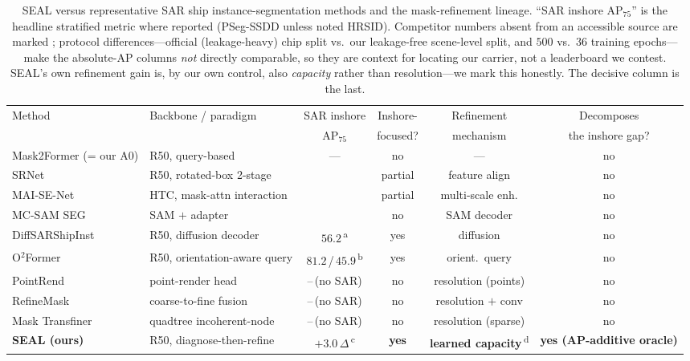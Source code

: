 \begin{table}[t]
\centering
\caption{SEAL versus representative SAR ship instance-segmentation methods and the mask-refinement lineage. ``SAR inshore AP$_{75}$'' is the headline stratified metric where reported (PSeg-SSDD unless noted HRSID). Competitor numbers absent from an accessible source are marked \TODO{}; protocol differences---official (leakage-heavy) chip split vs.\ our leakage-free scene-level split, and $500$ vs.\ $36$ training epochs---make the absolute-AP columns \emph{not} directly comparable, so they are context for locating our carrier, not a leaderboard we contest. SEAL's own refinement gain is, by our own control, also \emph{capacity} rather than resolution---we mark this honestly. The decisive column is the last.}
\label{tab:relatedwork}
\small
\begin{tabular}{@{}llcccc@{}}
\toprule
Method & Backbone / paradigm & SAR inshore & Inshore- & Refinement & Decomposes \\
 &  & AP$_{75}$ & focused? & mechanism & the inshore gap? \\
\midrule
Mask2Former \cite{cheng2022mask2former} (= our A0) & R50, query-based & --- & no & --- & no \\
SRNet \cite{yang2023srnet} & R50, rotated-box 2-stage & \TODO{} & partial & feature align & no \\
MAI-SE-Net \cite{zhang2022maisenet} & HTC, mask-attn interaction & \TODO{} & partial & multi-scale enh. & no \\
MC-SAM SEG \cite{zheng2024mcsamseg} & SAM $+$ adapter & \TODO{} & no & SAM decoder & no \\
DiffSARShipInst \cite{xu2025diffsarshipinst} & R50, diffusion decoder & $56.2$\,\textsuperscript{a} & yes & diffusion & no \\
O$^2$Former \cite{gao2025o2former} & R50, orientation-aware query & $81.2$\,/\,$45.9$\,\textsuperscript{b} & yes & orient.\ query & no \\
\midrule
PointRend \cite{kirillov2020pointrend} & point-render head & --\,(no SAR) & no & resolution (points) & no \\
RefineMask \cite{zhang2021refinemask} & coarse-to-fine fusion & --\,(no SAR) & no & resolution $+$ conv & no \\
Mask Transfiner \cite{ke2022masktransfiner} & quadtree incoherent-node & --\,(no SAR) & no & resolution (sparse) & no \\
\midrule
\textbf{SEAL (ours)} & R50, diagnose-then-refine & $+3.0$\,$\Delta$\,\textsuperscript{c} & \textbf{yes} & \textbf{learned capacity}\,\textsuperscript{d} & \textbf{yes (AP-additive oracle)} \\

\end{tabular}
\end{table}
